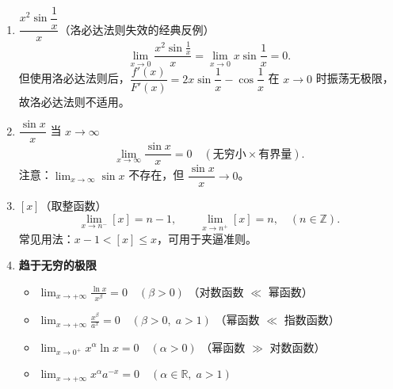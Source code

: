 \documentclass[../book.tex]{subfiles}
\begin{document}
\begin{enumerate}
        \item \textbf{$\dfrac{x^2\sin\dfrac{1}{x}}{x}$}（洛必达法则失效的经典反例）
        \[
            \lim_{x \to 0} \frac{x^2\sin\frac{1}{x}}{x} = \lim_{x \to 0} x\sin\frac{1}{x} = 0.
        \]
        但使用洛必达法则后，$\dfrac{f'(x)}{F'(x)} = 2x\sin\dfrac{1}{x} - \cos\dfrac{1}{x}$ 在 $x \to 0$ 时{\color{red}振荡无极限}，故洛必达法则不适用。

        \item \textbf{$\dfrac{\sin x}{x}$} 当 $x \to \infty$
        \[
            \lim_{x \to \infty} \frac{\sin x}{x} = 0 \quad (\text{无穷小} \times \text{有界量}).
        \]
        注意：$\displaystyle\lim_{x \to \infty} \sin x$ 不存在，但 $\dfrac{\sin x}{x} \to 0$。

        \item \textbf{$[x]$}（取整函数）
        \[
            \lim_{x \to n^-} [x] = n - 1, \qquad
            \lim_{x \to n^+} [x] = n, \quad (n \in \mathbb{Z}).
        \]
        常见用法：$x - 1 < [x] \leq x$，可用于夹逼准则。
        \item \textbf{趋于无穷的极限}
        \begin{itemize}
            \item $\displaystyle \lim_{x \to +\infty} \frac{\ln x}{x^\beta} = 0 \quad (\beta > 0)$ \quad （对数函数 $\ll$ 幂函数）
            \item $\displaystyle \lim_{x \to +\infty} \frac{x^\beta}{a^x} = 0 \quad (\beta > 0, \; a > 1)$ \quad （幂函数 $\ll$ 指数函数）
            \item $\displaystyle \lim_{x \to 0^+} x^\alpha \ln x = 0 \quad (\alpha > 0)$ \quad （幂函数 $\gg$ 对数函数）
            \item $\displaystyle \lim_{x \to +\infty} x^\alpha a^{-x} = 0 \quad (\alpha \in \mathbb{R}, \; a > 1)$
        \end{itemize}
    \end{enumerate}
\end{document}
